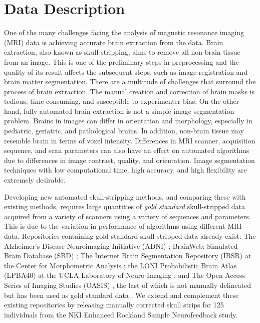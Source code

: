 \section*{Data Description}

\par One of the many challenges facing the analysis of magnetic resonance imaging (MRI) data is achieving accurate brain extraction from the data. Brain extraction, also known as skull-stripping, aims to remove all non-brain tissue from an image. This is one of the preliminary steps in preprocessing and the quality of its result affects the subsequent steps, such as image registration and brain matter segmentation. There are a multitude of challenges that surround the process of brain extraction. The manual creation and correction of brain masks is tedious, time-consuming, and susceptible to experimenter bias. On the other hand, fully automated brain extraction is not a simple image segmentation problem. Brains in images can differ in orientation and morphology, especially in pediatric, geriatric, and pathological brains. In addition, non-brain tissue may resemble brain in terms of voxel intensity. Differences in MRI scanner, acquisition sequence, and scan parameters can also have an effect on automated algorithms due to differences in image contrast, quality, and orientation. Image segmentation techniques with low computational time, high accuracy, and high flexibility are extremely desirable.
\par Developing new automated skull-stripping methods, and comparing these with existing methods, requires large quantities of \emph{gold standard} skull-stripped data acquired from a variety of scanners using a variety of sequences and parameters. This is due to the variation in performance of algorithms using different MRI data. Repositories containing gold standard skull-stripped data already exist: The Alzheimer's Disease Neuroimaging Initiative (ADNI) \cite{pmid17476317}; BrainWeb: Simulated Brain Database (SBD) \cite{brainweb}; The Internet Brain Segmentation Repository (IBSR) at the Center for Morphometric Analysis \cite{IBSR}; the LONI Probabilistic Brain Atlas (LPBA40) at the UCLA Laboratory of Neuro Imaging \cite{lpba40}; and The Open Access Series of Imaging Studies (OASIS) \cite{oasis}, the last of which is not manually delineated but has been used as gold standard data \cite{Iglesias2011, MASS}. We extend and complement these existing repositories by releasing manually corrected skull strips for 125 individuals from the NKI Enhanced Rockland Sample Neurofeedback study.

